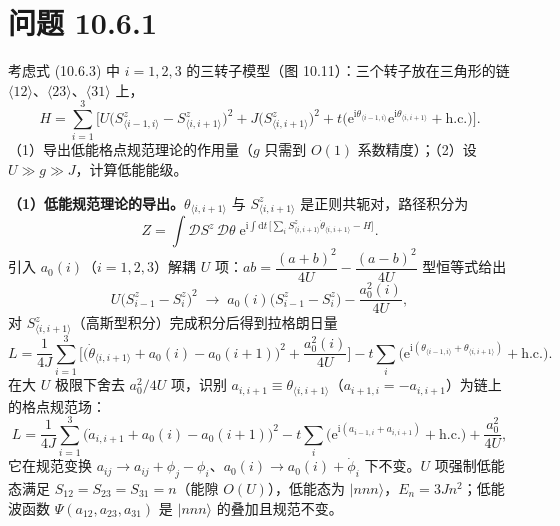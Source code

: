 \section*{问题 10.6.1}
\begin{problem}
考虑式 (10.6.3) 中 $i=1,2,3$ 的三转子模型（图 10.11）：三个转子放在三角形的链 $\langle12\rangle$、$\langle23\rangle$、$\langle31\rangle$ 上，
\begin{equation*}
H=\sum_{i=1}^{3}\Big[U\big(S_{\langle i-1,i\rangle}^{z}-S_{\langle i,i+1\rangle}^{z}\big)^{2}+J\big(S_{\langle i,i+1\rangle}^{z}\big)^{2}+t\big(\mathrm e^{\mathrm i\theta_{\langle i-1,i\rangle}}\mathrm e^{\mathrm i\theta_{\langle i,i+1\rangle}}+\text{h.c.}\big)\Big].
\end{equation*}
（1）导出低能格点规范理论的作用量（$g$ 只需到 $O(1)$ 系数精度）；（2）设 $U\gg g\gg J$，计算低能能级。
\end{problem}
\solution
\textbf{（1）低能规范理论的导出。}$\theta_{\langle i,i+1\rangle}$ 与 $S_{\langle i,i+1\rangle}^{z}$ 是正则共轭对，路径积分为
\begin{equation*}
Z=\int\mathcal D S^{z}\,\mathcal D\theta\;
\mathrm e^{\mathrm i\int\mathrm dt\,\big[\sum_{i}S_{\langle i,i+1\rangle}^{z}\dot\theta_{\langle i,i+1\rangle}-H\big]} .
\end{equation*}
引入 $a_0(i)$（$i=1,2,3$）解耦 $U$ 项：$ab=\dfrac{(a+b)^2}{4U}-\dfrac{(a-b)^2}{4U}$ 型恒等式给出
\begin{equation*}
U\big(S_{i-1}^{z}-S_{i}^{z}\big)^{2}\;\longrightarrow\;a_0(i)\big(S_{i-1}^{z}-S_{i}^{z}\big)-\frac{a_0^{2}(i)}{4U},
\end{equation*}
对 $S_{\langle i,i+1\rangle}^{z}$（高斯型积分）完成积分后得到拉格朗日量
\begin{equation*}
L=\frac{1}{4J}\sum_{i=1}^{3}\Big[\big(\dot\theta_{\langle i,i+1\rangle}+a_0(i)-a_0(i+1)\big)^{2}+\frac{a_0^{2}(i)}{4U}\Big]
-t\sum_{i}\big(\mathrm e^{\mathrm i(\theta_{\langle i-1,i\rangle}+\theta_{\langle i,i+1\rangle})}+\text{h.c.}\big).
\end{equation*}
在大 $U$ 极限下舍去 $a_0^{2}/4U$ 项，识别 $a_{i,i+1}\equiv\theta_{\langle i,i+1\rangle}$（$a_{i+1,i}=-a_{i,i+1}$）为链上的格点规范场：
\begin{equation*}
L=\frac{1}{4J}\sum_{i=1}^{3}\big(\dot a_{i,i+1}+a_0(i)-a_0(i+1)\big)^{2}
-t\sum_{i}\big(\mathrm e^{\mathrm i(a_{i-1,i}+a_{i,i+1})}+\text{h.c.}\big)+\frac{a_0^{2}}{4U},
\end{equation*}
它在规范变换 $a_{ij}\to a_{ij}+\phi_j-\phi_i$、$a_0(i)\to a_0(i)+\dot\phi_i$ 下不变。$U$ 项强制低能态满足 $S_{12}=S_{23}=S_{31}=n$（能隙 $O(U)$），低能态为 $|nnn\rangle$，$E_n=3Jn^{2}$；低能波函数 $\Psi(a_{12},a_{23},a_{31})$ 是 $|nnn\rangle$ 的叠加且规范不变。

